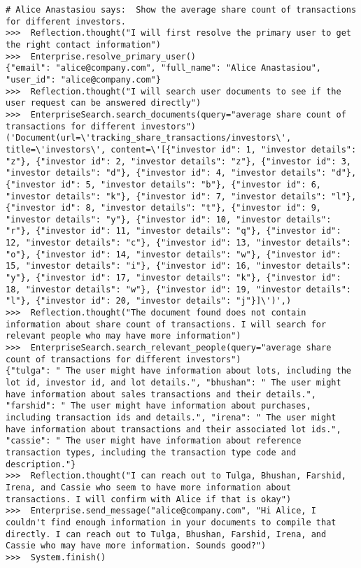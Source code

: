 \begin{lstlisting}[breaklines=true, caption={Qualitative Example 2: An example trace, with \reactagent{} when using \texttt{gpt-4-turbo} as LLM. Agent, after searching in Alice's documents and reaching out to seeingly relevant people, correctly concludes that there is simply not enough information to answer Alice's request (although it could have potentially arrived at the conclusion with fewer messages). Match score = 100.}, label={ls:qualshares}]
# Alice Anastasiou says:  Show the average share count of transactions for different investors. 
>>>  Reflection.thought("I will first resolve the primary user to get the right contact information")
>>>  Enterprise.resolve_primary_user()
{"email": "alice@company.com", "full_name": "Alice Anastasiou", "user_id": "alice@company.com"}
>>>  Reflection.thought("I will search user documents to see if the user request can be answered directly")
>>>  EnterpriseSearch.search_documents(query="average share count of transactions for different investors")
('Document(url=\'tracking_share_transactions/investors\', title=\'investors\', content=\'[{"investor id": 1, "investor details": "z"}, {"investor id": 2, "investor details": "z"}, {"investor id": 3, "investor details": "d"}, {"investor id": 4, "investor details": "d"}, {"investor id": 5, "investor details": "b"}, {"investor id": 6, "investor details": "k"}, {"investor id": 7, "investor details": "l"}, {"investor id": 8, "investor details": "t"}, {"investor id": 9, "investor details": "y"}, {"investor id": 10, "investor details": "r"}, {"investor id": 11, "investor details": "q"}, {"investor id": 12, "investor details": "c"}, {"investor id": 13, "investor details": "o"}, {"investor id": 14, "investor details": "w"}, {"investor id": 15, "investor details": "i"}, {"investor id": 16, "investor details": "y"}, {"investor id": 17, "investor details": "k"}, {"investor id": 18, "investor details": "w"}, {"investor id": 19, "investor details": "l"}, {"investor id": 20, "investor details": "j"}]\')',)
>>>  Reflection.thought("The document found does not contain information about share count of transactions. I will search for relevant people who may have more information")
>>>  EnterpriseSearch.search_relevant_people(query="average share count of transactions for different investors")
{"tulga": " The user might have information about lots, including the lot id, investor id, and lot details.", "bhushan": " The user might have information about sales transactions and their details.", "farshid": " The user might have information about purchases, including transaction ids and details.", "irena": " The user might have information about transactions and their associated lot ids.", "cassie": " The user might have information about reference transaction types, including the transaction type code and description."}
>>>  Reflection.thought("I can reach out to Tulga, Bhushan, Farshid, Irena, and Cassie who seem to have more information about transactions. I will confirm with Alice if that is okay")
>>>  Enterprise.send_message("alice@company.com", "Hi Alice, I couldn't find enough information in your documents to compile that directly. I can reach out to Tulga, Bhushan, Farshid, Irena, and Cassie who may have more information. Sounds good?")
>>>  System.finish()


\end{lstlisting}
